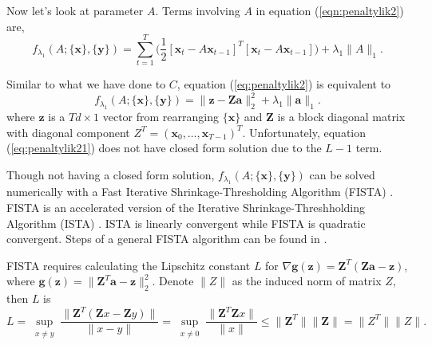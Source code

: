 \documentclass[fleqn]{article}
\let\oldref\ref
\renewcommand{\ref}[1]{(\oldref{#1})}
\newcommand{\T}{T}
\begin{document}
Now let's look at parameter $A$. Terms involving $A$ in equation \ref{eqn:penaltylik2} are,
\begin{equation}\label{eq:penaltylik2}
f_{\lambda_1}(A;\{\mathbf{x}\},\{\mathbf{y}\}) = \sum\limits_{t=1}^{T}\big(\frac{1}{2}[\mathbf{x}_t-A\mathbf{x}_{t-1}]^{\T}[\mathbf{x}_t-A\mathbf{x}_{t-1}]\big)+\lambda_1 \|A\|_1.
\end{equation}

Similar to what we have done to $C$, equation \ref{eq:penaltylik2} is equivalent to
\begin{equation}\label{eq:penaltylik21}
f_{\lambda_1}(A;\{\mathbf{x}\},\{\mathbf{y}\}) =  \|\mathbf{z}  - \mathbf{Za}\|_2^2 + \lambda_1\|\mathbf{a}\|_1.
\end{equation}
where $\mathbf{z}$ is a $Td \times 1$ vector from rearranging $\{\mathbf{x}\}$ and $\mathbf{Z}$ is a block diagonal matrix with diagonal component $Z^{\T} =(\mathbf{x}_0,\ldots,\mathbf{x}_{T-1})^{\T}$. Unfortunately, equation \ref{eq:penaltylik21} does not have closed form solution due to the $L-1$ term.


Though not having a closed form solution, $f_{\lambda_1}(A;\{\mathbf{x}\},\{\mathbf{y}\})$ can be solved numerically with a Fast Iterative Shrinkage-Thresholding Algorithm (FISTA) \cite{beck2009fast}. FISTA is an accelerated version of the Iterative Shrinkage-Threshholding Algorithm (ISTA) \cite{daubechies2004iterative}. ISTA is linearly convergent while FISTA is quadratic convergent. Steps of a general FISTA algorithm can be found in .

FISTA requires calculating the Lipschitz constant $L$ for $\nabla\mathbf{g(z)}=\mathbf{Z}^{\T}(\mathbf{Z}\mathbf{a} -\mathbf{z})$, where $\mathbf{g}(\mathbf{z})=\|\mathbf{Z}^{\T}\mathbf{a} -\mathbf{z}\|_2^2$. Denote $\|Z\|$ as the induced norm of matrix $Z$, then $L$ is
\[
L = \sup_{\substack{x\neq y}}\frac{\|\mathbf{Z}^{\T}(\mathbf{Z}x- \mathbf{Z}y)\|}{\|x-y\|}=\sup_{\substack{x\neq 0}}\frac{\|\mathbf{Z}^{\T}\mathbf{Z}x\|}{\|x\|}\leq\|\mathbf{Z}^{\T}\|\|\mathbf{Z}\| = \|Z^{\T}\|\|Z\|.
\]
\end{document}
